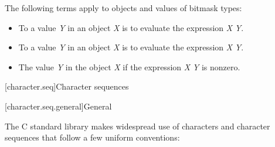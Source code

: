 \pnum
The following terms apply to objects and values of
bitmask types:
\begin{itemize}
\item
To 
a value \textit{Y} in an object \textit{X}
is to evaluate the expression \textit{X} \tcode{|=} \textit{Y}.
\item
To 
a value \textit{Y} in an object
\textit{X} is to evaluate the expression \textit{X} \tcode{\&= \~}\textit{Y}.
\item
The value \textit{Y}  in the object
\textit{X} if the expression \textit{X} \tcode{\&} \textit{Y} is nonzero.
\end{itemize}

[character.seq]{Character sequences}

[character.seq.general]{General}

\pnum
The C standard library makes widespread use
%
of characters and character sequences that follow a few uniform conventions:

